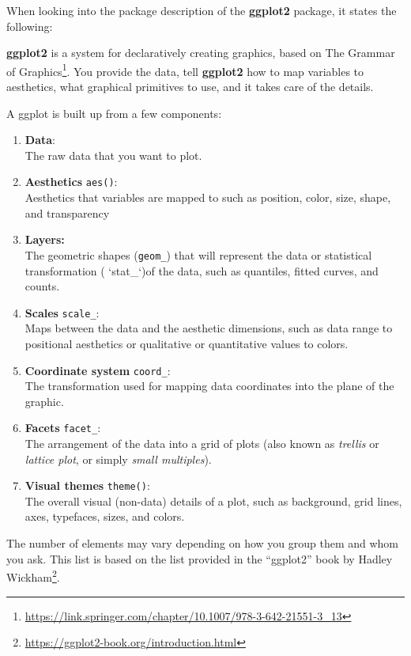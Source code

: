 \documentclass[
]{krantz}
\providecommand{\tightlist}{%
  \setlength{\itemsep}{0pt}\setlength{\parskip}{0pt}}
\renewenvironment{quote}{\begin{VF}}{\end{VF}}
\renewcommand{\href}[2]{#2\footnote{\url{#1}}}
\begin{document}
When looking into the package description of the \textbf{ggplot2} package, it states the following:

\begin{quote}
\textbf{ggplot2} is a system for declaratively creating graphics, based on \href{https://link.springer.com/chapter/10.1007/978-3-642-21551-3_13}{The Grammar of Graphics}. You provide the data, tell \textbf{ggplot2} how to map variables to aesthetics, what graphical primitives to use, and it takes care of the details.
\end{quote}

A ggplot is built up from a few components:

\begin{enumerate}
\def\labelenumi{\arabic{enumi}.}
\tightlist
\item
  \textbf{Data}:\\
  The raw data that you want to plot.
\item
  \textbf{Aesthetics} \texttt{aes()}:\\
  Aesthetics that variables are mapped to such as position, color, size, shape, and transparency
\item
  \textbf{Layers:}\\
  The geometric shapes (\texttt{geom\_}) that will represent the data or statistical transformation ( `stat\_`)of the data, such as quantiles, fitted curves, and counts.
\item
  \textbf{Scales} \texttt{scale\_}:\\
  Maps between the data and the aesthetic dimensions, such as data range to positional aesthetics or qualitative or quantitative values to colors.
\item
  \textbf{Coordinate system} \texttt{coord\_}:\\
  The transformation used for mapping data coordinates into the plane of the graphic.
\item
  \textbf{Facets} \texttt{facet\_}:\\
  The arrangement of the data into a grid of plots (also known as \emph{trellis} or \emph{lattice plot}, or simply \emph{small multiples}).
\item
  \textbf{Visual themes} \texttt{theme()}:\\
  The overall visual (non-data) details of a plot, such as background, grid lines, axes, typefaces, sizes, and colors.
\end{enumerate}

The number of elements may vary depending on how you group them and whom you ask. This list is based on the list provided in the \href{https://ggplot2-book.org/introduction.html}{``ggplot2'' book by Hadley Wickham}.
\end{document}
